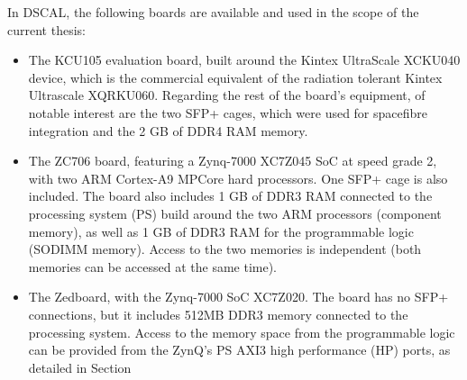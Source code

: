 In DSCAL, the following boards are available and used in the scope of the current thesis:
\begin{itemize}
    \item The KCU105 evaluation board, built around the Kintex UltraScale XCKU040 device, which is the commercial equivalent of the radiation tolerant Kintex Ultrascale XQRKU060. Regarding the rest of the board's equipment, of notable interest are the two SFP+ cages, which were used for spacefibre integration and the 2 GB of DDR4 RAM memory.
    \item The ZC706 board, featuring a Zynq-7000 XC7Z045 SoC at speed grade 2, with two ARM Cortex-A9 MPCore hard processors. One SFP+ cage is also included. The board also includes 1 GB of DDR3 RAM connected to the processing system (PS) build around the two ARM processors (component memory), as well as 1 GB of DDR3 RAM for the programmable logic (SODIMM memory). Access to the two memories is independent (both memories can be accessed at the same time).
    \item The Zedboard, with the Zynq-7000 SoC XC7Z020. The board has no SFP+ connections, but it includes 512MB DDR3 memory connected to the processing system. Access to the memory space from the programmable logic can be provided from the ZynQ's PS AXI3 high performance (HP) ports, as detailed in Section 
\end{itemize}

